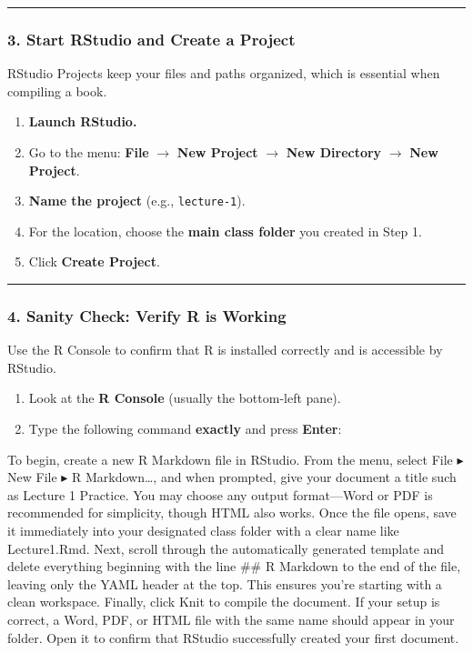 \documentclass[
  letterpaper,
  DIV=11,
  numbers=noendperiod]{scrreprt}
\providecommand{\tightlist}{%
  \setlength{\itemsep}{0pt}\setlength{\parskip}{0pt}}
\begin{document}
\begin{center}\rule{0.5\linewidth}{0.5pt}\end{center}

\subsubsection{3. Start RStudio and Create a
Project}\label{start-rstudio-and-create-a-project}

RStudio Projects keep your files and paths organized, which is essential
when compiling a book.

\begin{enumerate}
\def\labelenumi{\arabic{enumi}.}
\tightlist
\item
  \textbf{Launch RStudio.}
\item
  Go to the menu: \textbf{File} \(\to\) \textbf{New Project} \(\to\)
  \textbf{New Directory} \(\to\) \textbf{New Project}.
\item
  \textbf{Name the project} (e.g., \texttt{lecture-1}).
\item
  For the location, choose the \textbf{main class folder} you created in
  Step 1.
\item
  Click \textbf{Create Project}.
\end{enumerate}

\begin{center}\rule{0.5\linewidth}{0.5pt}\end{center}

\subsubsection{4. Sanity Check: Verify R is
Working}\label{sanity-check-verify-r-is-working}

Use the R Console to confirm that R is installed correctly and is
accessible by RStudio.

\begin{enumerate}
\def\labelenumi{\arabic{enumi}.}
\tightlist
\item
  Look at the \textbf{R Console} (usually the bottom-left pane).
\item
  Type the following command \textbf{exactly} and press \textbf{Enter}:
\end{enumerate}

To begin, create a new R Markdown file in RStudio. From the menu, select
File ▸ New File ▸ R Markdown\ldots, and when prompted, give your
document a title such as Lecture 1 Practice. You may choose any output
format---Word or PDF is recommended for simplicity, though HTML also
works. Once the file opens, save it immediately into your designated
class folder with a clear name like Lecture1.Rmd. Next, scroll through
the automatically generated template and delete everything beginning
with the line \#\# R Markdown to the end of the file, leaving only the
YAML header at the top. This ensures you're starting with a clean
workspace. Finally, click Knit to compile the document. If your setup is
correct, a Word, PDF, or HTML file with the same name should appear in
your folder. Open it to confirm that RStudio successfully created your
first document.
\end{document}
